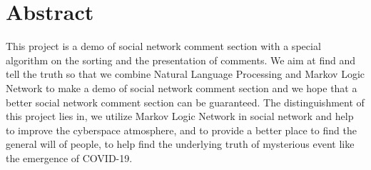 \documentclass[
12pt, %
a4paper, %
oneside, %
headinclude,footinclude, %
BCOR5mm, %
]{scrartcl}
\title{\normalfont\spacedallcaps{ERG3020 Report}} %
\author{\spacedlowsmallcaps{Zhuoyu Li\& Bokai Xu\& Xiyan Luo}} %
\date{2021.5.5} %
\begin{document}

\renewcommand{\sectionmark}[1]{\markright{\spacedlowsmallcaps{#1}}} %
\lehead{\mbox{\llap{\small\thepage\kern1em\color{halfgray} \vline}\color{halfgray}\hspace{0.5em}\rightmark\hfil}} %

\pagestyle{scrheadings} %


\maketitle %

\setcounter{tocdepth}{2} %

\tableofcontents %




\section*{Abstract} %

This project is a demo of social network comment section with a special algorithm on the sorting and the presentation of comments. We aim at find and tell the truth so that we combine Natural Language Processing and Markov Logic Network to make a demo of social network comment section and we hope that a better social network comment section can be guaranteed. The distinguishment of this project lies in, we utilize Markov Logic Network in social network and help to improve the cyberspace atmosphere, and to provide a better place to find the general will of people, to help find the underlying truth of mysterious event like the emergence of COVID-19.
\end{document}
